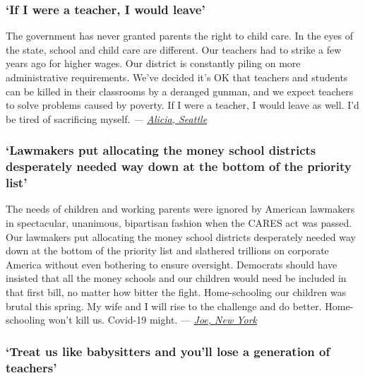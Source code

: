 \hypertarget{if-i-were-a-teacher-i-would-leave}{%
\subsubsection{\texorpdfstring{\textbf{`If I were a teacher, I would
leave'}}{`If I were a teacher, I would leave'}}\label{if-i-were-a-teacher-i-would-leave}}

The government has never granted parents the right to child care. In the
eyes of the state, school and child care are different. Our teachers had
to strike a few years ago for higher wages. Our district is constantly
piling on more administrative requirements. We've decided it's OK that
teachers and students can be killed in their classrooms by a deranged
gunman, and we expect teachers to solve problems caused by poverty. If I
were a teacher, I would leave as well. I'd be tired of sacrificing
myself. \emph{---}
\href{https://nyti.ms/2D27dwA\#permid=108212644}{\emph{Alicia, Seattle}}

\hypertarget{lawmakers-put-allocating-the-money-school-districts-desperately-needed-way-down-at-the-bottom-of-the-priority-list}{%
\subsubsection{\texorpdfstring{\textbf{`\textbf{Lawmakers put allocating
the money school districts desperately needed way down at the bottom of
the priority
list}'}}{`Lawmakers put allocating the money school districts desperately needed way down at the bottom of the priority list'}}\label{lawmakers-put-allocating-the-money-school-districts-desperately-needed-way-down-at-the-bottom-of-the-priority-list}}

The needs of children and working parents were ignored by American
lawmakers in spectacular, unanimous, bipartisan fashion when the CARES
act was passed. Our lawmakers put allocating the money school districts
desperately needed way down at the bottom of the priority list and
slathered trillions on corporate America without even bothering to
ensure oversight. Democrats should have insisted that all the money
schools and our children would need be included in that first bill, no
matter how bitter the fight. Home-schooling our children was brutal this
spring. My wife and I will rise to the challenge and do better.
Home-schooling won't kill us. Covid-19 might. ---
\href{https://nyti.ms/32rAT17\#permid=108140607}{\emph{Joe, New York}}

\hypertarget{treat-us-like-babysitters-and-youll-lose-a-generation-of-teachers}{%
\subsubsection{\texorpdfstring{\textbf{`Treat us like babysitters and
you'll lose a generation of
teachers'}}{`Treat us like babysitters and you'll lose a generation of teachers'}}\label{treat-us-like-babysitters-and-youll-lose-a-generation-of-teachers}}

